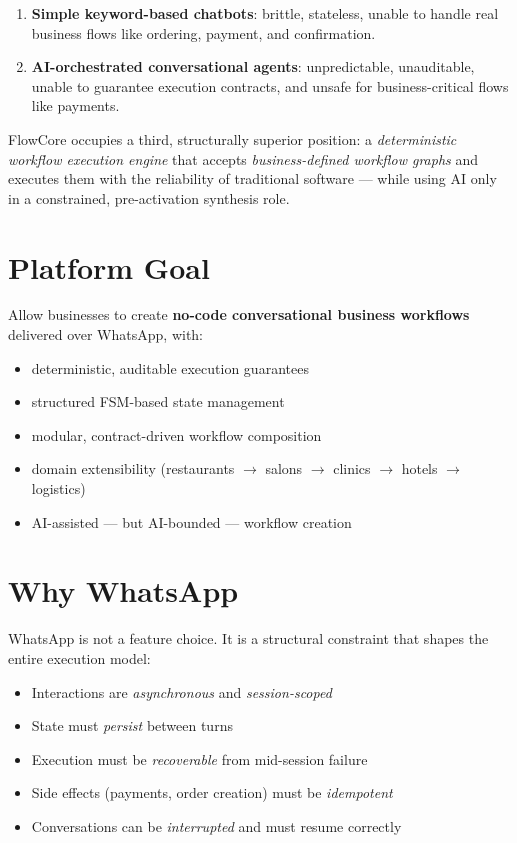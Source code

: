 \documentclass[12pt, a4paper]{report}
\begin{document}
\begin{enumerate}
  \item \textbf{Simple keyword-based chatbots}: brittle, stateless, unable to handle real business flows like ordering, payment, and confirmation.
  \item \textbf{AI-orchestrated conversational agents}: unpredictable, unauditable, unable to guarantee execution contracts, and unsafe for business-critical flows like payments.
\end{enumerate}

FlowCore occupies a third, structurally superior position: a \textit{deterministic workflow execution engine} that accepts \textit{business-defined workflow graphs} and executes them with the reliability of traditional software --- while using AI only in a constrained, pre-activation synthesis role.

\section{Platform Goal}

Allow businesses to create \textbf{no-code conversational business workflows} delivered over WhatsApp, with:

\begin{itemize}
  \item deterministic, auditable execution guarantees
  \item structured FSM-based state management
  \item modular, contract-driven workflow composition
  \item domain extensibility (restaurants $\to$ salons $\to$ clinics $\to$ hotels $\to$ logistics)
  \item AI-assisted --- but AI-bounded --- workflow creation
\end{itemize}

\section{Why WhatsApp}

WhatsApp is not a feature choice. It is a structural constraint that shapes the entire execution model:

\begin{itemize}
  \item Interactions are \textit{asynchronous} and \textit{session-scoped}
  \item State must \textit{persist} between turns
  \item Execution must be \textit{recoverable} from mid-session failure
  \item Side effects (payments, order creation) must be \textit{idempotent}
  \item Conversations can be \textit{interrupted} and must resume correctly
\end{itemize}
\end{document}
